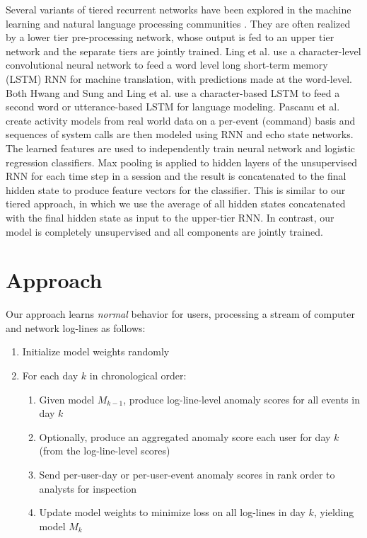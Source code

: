\documentclass[letterpaper]{article} %
\begin{document}
Several variants of tiered recurrent networks have been explored in the machine learning and natural language processing communities \cite{koutnik2014clockwork,ling2015character,ling2015finding,chung2015gated}. 
They are often realized by a lower tier pre-processing network, whose output is fed to an upper tier network and the separate tiers are jointly trained. 
Ling et al.  use a character-level convolutional neural network to feed a word level long short-term memory (LSTM) RNN for machine translation, with predictions made at the word-level. 
Both Hwang and Sung  and Ling et al.  use a character-based LSTM to feed a second word or utterance-based LSTM for language modeling. 
Pascanu et al.  create activity models from real world data on a per-event (command) basis and sequences of system calls are then modeled using RNN and echo state networks. 
The learned features are used to independently train neural network and logistic regression classifiers. 
Max pooling is applied to hidden layers of the unsupervised RNN for each time step in a session and the result is concatenated to the final hidden state to produce feature vectors for the classifier. 
This is similar to our tiered approach, in which we use the average of all hidden states concatenated with the final hidden state as input to the upper-tier RNN. 
In contrast, our model is completely unsupervised and all components are jointly trained. 

\section{Approach} 

Our approach learns {\it normal} behavior for users, processing a stream of computer and network log-lines as follows:
\begin{enumerate}
    \item \setlength{\parskip}{-3pt} Initialize model weights randomly
    \item For each day $k$ in chronological order:
        \begin{enumerate}
            \item Given model $M_{k-1}$, produce log-line-level anomaly scores for all events in day $k$
            \item Optionally, produce an aggregated anomaly score each user for day $k$ (from the log-line-level scores)
            \item Send per-user-day or per-user-event anomaly scores in rank order to analysts for inspection
            \item Update model weights to minimize loss on all log-lines in day $k$, yielding model $M_k$
        \end{enumerate}
\end{enumerate}
\end{document}

